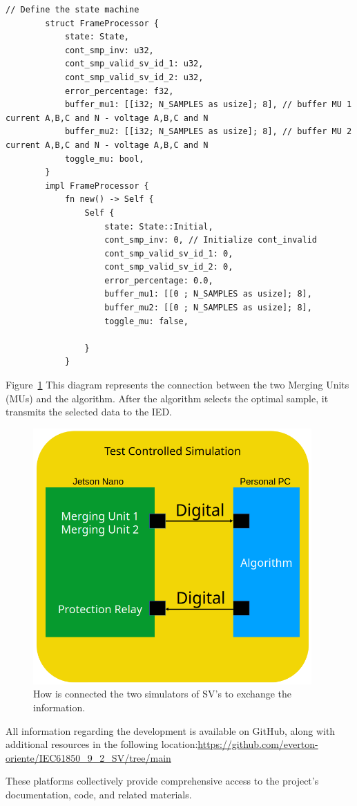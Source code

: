 	\begin{lstlisting}[caption={State Machine struct. }]
		// Define the state machine
		struct FrameProcessor {
			state: State,
			cont_smp_inv: u32,
			cont_smp_valid_sv_id_1: u32,
			cont_smp_valid_sv_id_2: u32,
			error_percentage: f32,
			buffer_mu1: [[i32; N_SAMPLES as usize]; 8], // buffer MU 1 current A,B,C and N - voltage A,B,C and N
			buffer_mu2: [[i32; N_SAMPLES as usize]; 8], // buffer MU 2 current A,B,C and N - voltage A,B,C and N
			toggle_mu: bool,
		}
		impl FrameProcessor {
			fn new() -> Self {
				Self {
					state: State::Initial,
					cont_smp_inv: 0, // Initialize cont_invalid
					cont_smp_valid_sv_id_1: 0,
					cont_smp_valid_sv_id_2: 0,
					error_percentage: 0.0,
					buffer_mu1: [[0 ; N_SAMPLES as usize]; 8],
					buffer_mu2: [[0 ; N_SAMPLES as usize]; 8],
					toggle_mu: false,
					
				}
			}
		\end{lstlisting}
		
		Figure~\ref{fig:test_setup} This diagram represents the connection between the two Merging Units (MUs) and the algorithm. After the algorithm selects the optimal sample, it transmits the selected data to the IED.
		
		\begin{figure}[tbh]
			\centering
			\includegraphics[width=0.95\textwidth, keepaspectratio]{ch5/assets/test_setup.png}
			\caption{How is connected the two simulators of SV's to exchange the information.}
			\label{fig:test_setup}
		\end{figure}
		\FloatBarrier
		
All information regarding the development is available on GitHub, along with additional resources in the following location:\url{https://github.com/everton-oriente/IEC61850_9_2_SV/tree/main}

These platforms collectively provide comprehensive access to the project's documentation, code, and related materials.
